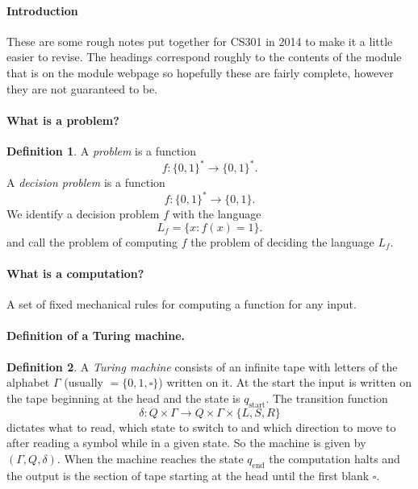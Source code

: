 \documentclass[11pt,a4paper]{article}
\theoremstyle{definition}
\newtheorem{defn}{Definition}
\begin{document}
\maketitle

\paragraph{Introduction}
These are some rough notes put together for CS301 in 2014 to make it a little easier to revise.
The headings correspond roughly to the contents of the module that is on the module webpage so hopefully these are fairly complete, however they are not guaranteed to be.

\paragraph{What is a problem?}
\begin{defn}
A \emph{problem} is a function
\[
f\colon\{0,1\}^*\to\{0,1\}^*.
\]
A \emph{decision problem} is a function
\[
f\colon\{0,1\}^*\to\{0,1\}.
\]
We identify a decision problem $f$ with the language
\[
L_f = \{x : f(x) = 1\}.
\]
and call the problem of computing $f$ the problem of deciding the language $L_f$.
\end{defn}

\paragraph{What is a computation?}
A set of fixed mechanical rules for computing a function for any input.

\paragraph{Definition of a Turing machine.}
\begin{defn}
A \emph{Turing machine} consists of an infinite tape with letters of the alphabet $\Gamma$ (usually $=\{0,1,\square\}$) written on it.
At the start the input is written on the tape beginning at the head and the state is $q_\text{start}$.
The transition function
\[
\delta\colon Q\times \Gamma \to Q\times \Gamma \times \{L,S,R\}
\]
dictates what to read, which state to switch to and which direction to move to after reading a symbol while in a given state.
So the machine is given by $(\Gamma,Q,\delta)$.
When the machine reaches the state $q_\text{end}$ the computation halts and the output is the section of tape starting at the head until the first blank $\square$.
\end{defn}
\end{document}
